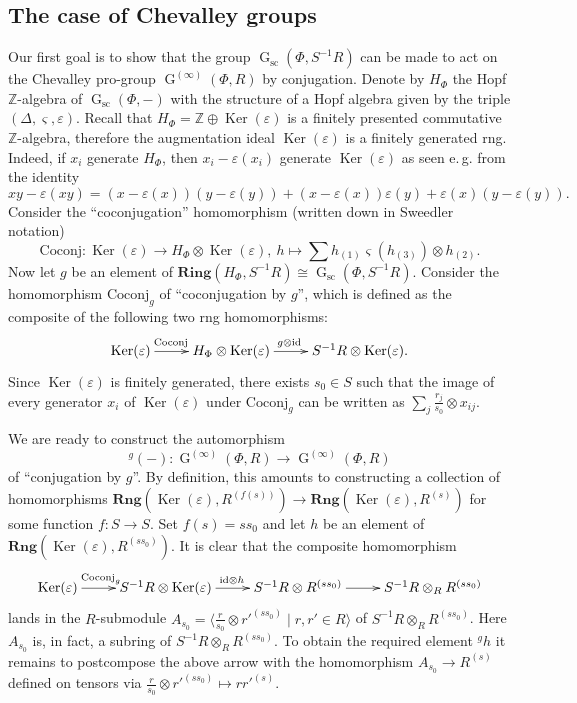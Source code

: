 \documentclass[oneside, 11pt]{amsart}
\numberwithin{equation}{section}
\theoremstyle{definition}
\theoremstyle{remark}
\DeclareMathOperator\Ker{Ker}
\DeclareMathOperator\GG{G}
\newcommand{\Rng}{\mathbf{Rng}}
\newcommand{\ZZ}{\mathbb{Z}}
\newcommand{\up}[2]{{^{#1}\!{#2}}}
\begin{document}
\subsection{The case of Chevalley groups} \label{sec:local-Chevalley}
Our first goal is to show that the group \(\GG_{\mathrm{sc}}(\Phi, S^{-1} R)\) can be made to act on the Chevalley pro-group \(\GG^{(\infty)}(\Phi, R)\) by conjugation. Denote by \(H_\Phi\) the Hopf \(\ZZ\)-algebra of \(\GG_{\mathrm{sc}}(\Phi, -)\) with the structure of a Hopf algebra given by the triple $(\Delta, \varsigma, \varepsilon)$. Recall that \(H_\Phi=\ZZ\oplus\Ker(\varepsilon)\) is a finitely presented commutative \(\ZZ\)-algebra, therefore the augmentation ideal $\Ker(\varepsilon)$ is a finitely generated rng. Indeed, if $x_i$ generate $H_\Phi$, then $x_i - \varepsilon(x_i)$ generate $\Ker(\varepsilon)$ as seen e.\,g. from the identity
\[xy - \varepsilon(xy) = (x - \varepsilon(x)) (y - \varepsilon(y)) + (x - \varepsilon(x)) \varepsilon(y) + \varepsilon(x) (y - \varepsilon(y)).\]
Consider the ``coconjugation'' homomorphism (written down in Sweedler notation)
\[\mathrm{Coconj} \colon \Ker(\varepsilon) \to H_\Phi \otimes \Ker(\varepsilon),\ h \mapsto \sum h_{(1)} \varsigma(h_{(3)}) \otimes h_{(2)}.\]
Now let $g$ be an element of $\mathbf{Ring}(H_\Phi, S^{-1}R) \cong \GG_{\mathrm{sc}}(\Phi, S^{-1} R)$.
Consider the homomorphism $\mathrm{Coconj}_g$ of ``coconjugation by $g$'', which is defined as the composite of the following two rng homomorphisms:
\[\xymatrix{\Ker(\varepsilon) \ar[r]^(.4){\mathrm{Coconj}} & H_\Phi \otimes \Ker(\varepsilon) \ar[r]^(0.45){g\otimes\mathrm{id}} & S^{-1}R \otimes \Ker(\varepsilon).}\]
Since $\Ker(\varepsilon)$ is finitely generated, there exists $s_0 \in S$ such that the image of every generator $x_i$ of $\Ker(\varepsilon)$ under $\mathrm{Coconj}_g$ can be written as $\sum_j \frac{r_j}{s_0} \otimes x_{ij}$.

We are ready to construct the automorphism \[\up g{(-)} \colon \GG^{(\infty)}(\Phi, R) \to \GG^{(\infty)}(\Phi, R)\] of ``conjugation by $g$''. By definition, this amounts to constructing a collection of homomorphisms
$\Rng(\Ker(\varepsilon), R^{(f(s))}) \to \Rng(\Ker(\varepsilon), R^{(s)})$ for some function $f \colon S \to S$. Set $f(s) = ss_0$ and let $h$ be an element of $\Rng(\Ker(\varepsilon), R^{(ss_0)})$. It is clear that the composite homomorphism
\[\xymatrix{ \Ker(\varepsilon) \ar[r]^(0.4){\mathrm{Coconj}_g} & S^{-1}R \otimes \Ker(\varepsilon) \ar[r]^{\mathrm{id}\otimes h} & S^{-1}R \otimes R^{(ss_0)} \ar[r] & S^{-1}R \otimes_R R^{(ss_0)}}\]
lands in the $R$-submodule $A_{s_0} = \langle \frac{r}{s_0} \otimes r'^{(ss_0)}\mid r, r' \in R \rangle$ of $S^{-1}R \otimes_R R^{(ss_0)}$. Here $A_{s_0}$ is, in fact, a subring of $S^{-1}R \otimes_R R^{(ss_0)}$. To obtain the required element $\up g h$ it remains to postcompose the above arrow with the homomorphism $A_{s_0} \to R^{(s)}$ defined on tensors via $\frac{r}{s_0} \otimes r'^{(ss_0)} \mapsto rr'^{(s)}$.
\end{document}
